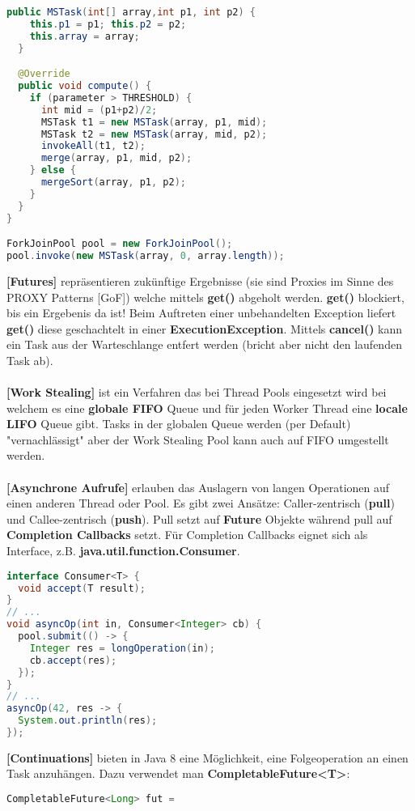 \documentclass[8pt]{extarticle}
\let\oldtextbf\textbf
\renewcommand{\textbf}{\tiny\oldtextbf}
\begin{document}
\begin{multicols*}{5}
\begin{lstlisting}[language=java]
  public MSTask(int[] array,int p1, int p2) {
    this.p1 = p1; this.p2 = p2;
    this.array = array;
  }

  @Override
  public void compute() {
    if (parameter > THRESHOLD) {
      int mid = (p1+p2)/2;
      MSTask t1 = new MSTask(array, p1, mid);
      MSTask t2 = new MSTask(array, mid, p2);
      invokeAll(t1, t2);
      merge(array, p1, mid, p2);
    } else {
      mergeSort(array, p1, p2);
    }
  }
}

ForkJoinPool pool = new ForkJoinPool();
pool.invoke(new MSTask(array, 0, array.length));
\end{lstlisting}
\textbf{[Futures]} repräsentieren zukünftige Ergebnisse (sie sind Proxies im Sinne des PROXY Patterns [GoF]) welche mittels \textbf{get()} abgeholt werden. \textbf{get()} blockiert, bis ein Ergebenis da ist! Beim Auftreten einer unbehandelten Exception liefert \textbf{get()} diese geschachtelt in einer \textbf{ExecutionException}. Mittels \textbf{cancel()} kann ein Task aus der Warteschlange entfert werden (bricht aber nicht den laufenden Task ab).\\\\
\textbf{[Work Stealing]} ist ein Verfahren das bei Thread Pools eingesetzt wird bei welchem es eine \textbf{globale FIFO} Queue und für jeden Worker Thread eine \textbf{locale LIFO} Queue gibt. Tasks in der globalen Queue werden (per Default) "vernachlässigt" aber der Work Stealing Pool kann auch auf FIFO umgestellt werden.\\\\
\textbf{[Asynchrone Aufrufe]} erlauben das Auslagern von langen Operationen auf einen anderen Thread oder Pool. Es gibt zwei Ansätze: Caller-zentrisch (\textbf{pull}) und Callee-zentrisch (\textbf{push}). Pull setzt auf \textbf{Future} Objekte während pull auf \textbf{Completion Callbacks} setzt. Für Completion Callbacks eignet sich als Interface, z.B. \textbf{java.util.function.Consumer}.
\begin{lstlisting}[language=java]
interface Consumer<T> {
  void accept(T result);
}
// ...
void asyncOp(int in, Consumer<Integer> cb) {
  pool.submit(() -> {
    Integer res = longOperation(in);
    cb.accept(res);
  });
}
// ...
asyncOp(42, res -> {
  System.out.println(res);
});
\end{lstlisting}
\textbf{[Continuations]} bieten in Java 8 eine Möglichkeit, eine Folgeoperation an einen Task anzuhängen. Dazu verwendet man \textbf{CompletableFuture<T>}:
\begin{lstlisting}[language=java]
CompletableFuture<Long> fut = 

\end{lstlisting}
\end{multicols*}
\end{document}
